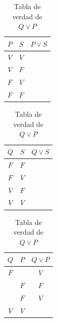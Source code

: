 \documentclass[letterpaper, twoside]{article}
\begin{document}
\begin{table}[h]
  
  \centering
  \begin{minipage}[t]{0.31\textwidth}
    \centering
    \begin{tabular}{|c|c|c|}
      \hline
      $P$ & $S$ & $P\lor S$ \\ \hline
      $V$ & $V$ &  \\ \hline
      $V$ & $F$ &  \\ \hline
      $F$ & $V$ &  \\ \hline
      $F$ & $F$ &  \\
      \hline
    \end{tabular}
    \caption*{Tabla de verdad de $P\lor S$}
  \end{minipage}
  \hfil
  \begin{minipage}[t]{0.31\textwidth}
    \centering
    \begin{tabular}{|c|c|c|}
      \hline
      $Q$ & $S$ & $Q\lor S$ \\ \hline
      $F$ & $F$ &  \\ \hline
      $F$ & $V$ &  \\ \hline
      $V$ & $F$ &  \\ \hline
      $V$ & $V$ &  \\
      \hline
    \end{tabular}
    \caption*{Tabla de verdad de $Q\lor S$}
  \end{minipage}
  \begin{minipage}[t]{0.31\textwidth}
    \centering
    \begin{tabular}{|c|c|c|}
      \hline
      $Q$ & $P$ & $Q\lor P$ \\ \hline
      $F$ &     &  $V$ \\ \hline
          & $F$ &  $F$ \\ \hline
          & $F$ &  $V$ \\ \hline
      $V$ & $V$ &  \\
      \hline
    \end{tabular}
    \caption*{Tabla de verdad de $Q\lor P$}
  \end{minipage}

\end{table}

\newpage

\clearpage
\fancyhf{}
\setcounter{page}{1} %
\cfoot{\thepage}
\end{document}
